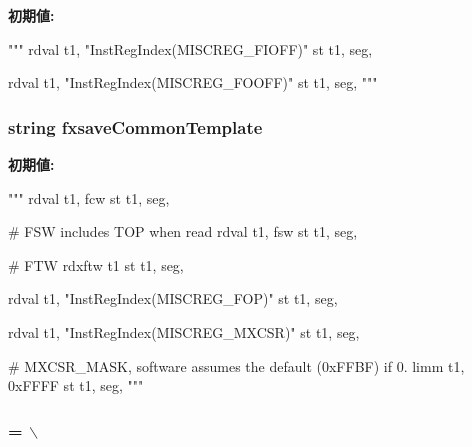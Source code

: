 {\bfseries 初期値:}
\begin{DoxyCode}
"""
    rdval t1, "InstRegIndex(MISCREG_FIOFF)"
    st t1, seg, %

    rdval t1, "InstRegIndex(MISCREG_FOOFF)"
    st t1, seg, %
"""
\end{DoxyCode}
\hypertarget{namespaceinsts_1_1simd128_1_1integer_1_1save__and__restore__state_1_1save__and__restore__state_aac142ffb713d0c2d93b20507b0478beb}{
\subsubsection[{fxsaveCommonTemplate}]{\setlength{\rightskip}{0pt plus 5cm}string {\bf fxsaveCommonTemplate}}}
\label{namespaceinsts_1_1simd128_1_1integer_1_1save__and__restore__state_1_1save__and__restore__state_aac142ffb713d0c2d93b20507b0478beb}
{\bfseries 初期値:}
\begin{DoxyCode}
"""
    rdval t1, fcw
    st t1, seg, %

    # FSW includes TOP when read
    rdval t1, fsw
    st t1, seg, %

    # FTW
    rdxftw t1
    st t1, seg, %

    rdval t1, "InstRegIndex(MISCREG_FOP)"
    st t1, seg, %

    rdval t1, "InstRegIndex(MISCREG_MXCSR)"
    st t1, seg, %

    # MXCSR_MASK, software assumes the default (0xFFBF) if 0.
    limm t1, 0xFFFF
    st t1, seg, %
"""
\end{DoxyCode}
\hypertarget{namespaceinsts_1_1simd128_1_1integer_1_1save__and__restore__state_1_1save__and__restore__state_a4c336f75776a67ec7e56c09e918c4f21}{
\subsubsection[{loadAllDataRegs}]{ = $\backslash$}}
